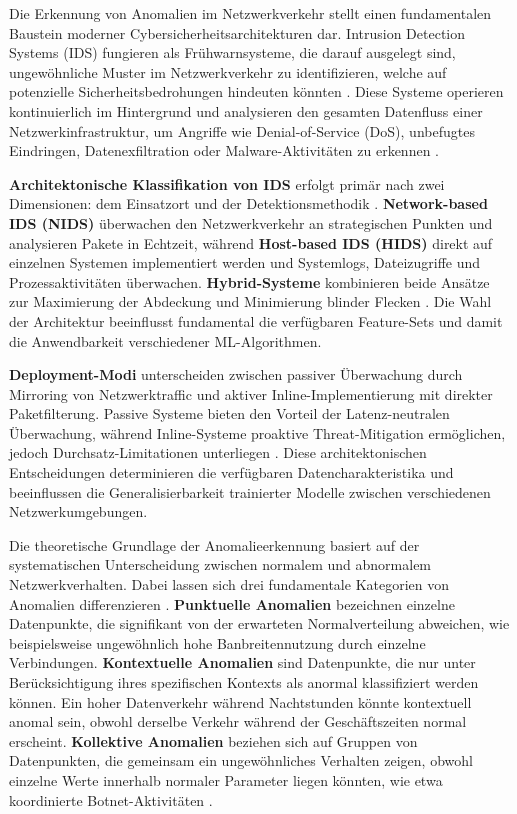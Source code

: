 \documentclass[11pt,a4paper]{article}
\begin{document}
    Die Erkennung von Anomalien im Netzwerkverkehr stellt einen fundamentalen Baustein moderner Cybersicherheitsarchitekturen dar. Intrusion Detection Systems (IDS) fungieren als Frühwarnsysteme, die darauf ausgelegt sind, ungewöhnliche Muster im Netzwerkverkehr zu identifizieren, welche  auf potenzielle Sicherheitsbedrohungen hindeuten könnten \parencite{Ring2019}. Diese Systeme operieren kontinuierlich im Hintergrund und analysieren den gesamten Datenfluss einer Netzwerkinfrastruktur, um Angriffe wie Denial-of-Service (DoS), unbefugtes Eindringen, Datenexfiltration oder Malware-Aktivitäten zu erkennen \parencite{Vinayakumar2019}.

    \textbf{Architektonische Klassifikation von IDS} erfolgt primär nach zwei Dimensionen: dem Einsatzort und der Detektionsmethodik \parencite{Ring2019}. \textbf{Network-based IDS (NIDS)} überwachen den Netzwerkverkehr an strategischen Punkten und analysieren Pakete in Echtzeit, während \textbf{Host-based IDS (HIDS)} direkt auf einzelnen Systemen implementiert werden und Systemlogs, Dateizugriffe und Prozessaktivitäten überwachen. \textbf{Hybrid-Systeme} kombinieren beide Ansätze zur Maximierung der Abdeckung und Minimierung blinder Flecken \parencite{Gharib2016}. Die Wahl der Architektur beeinflusst fundamental die verfügbaren Feature-Sets und damit die Anwendbarkeit verschiedener ML-Algorithmen.

    \textbf{Deployment-Modi} unterscheiden zwischen passiver Überwachung durch Mirroring von Netzwerktraffic und aktiver Inline-Implementierung mit direkter Paketfilterung. Passive Systeme bieten den Vorteil der Latenz-neutralen Überwachung, während Inline-Systeme proaktive Threat-Mitigation ermöglichen, jedoch Durchsatz-Limitationen unterliegen \parencite{Vinayakumar2019}. Diese architektonischen Entscheidungen determinieren die verfügbaren Datencharakteristika und beeinflussen die Generalisierbarkeit trainierter Modelle zwischen verschiedenen Netzwerkumgebungen.

    Die theoretische Grundlage der Anomalieerkennung basiert auf der systematischen Unterscheidung zwischen normalem und abnormalem Netzwerkverhalten. Dabei lassen sich drei fundamentale Kategorien von Anomalien differenzieren \parencite{Ring2019}. \textbf{Punktuelle Anomalien} bezeichnen einzelne Datenpunkte, die signifikant von der erwarteten Normalverteilung abweichen, wie beispielsweise ungewöhnlich hohe Banbreitennutzung durch einzelne Verbindungen. \textbf{Kontextuelle Anomalien} sind Datenpunkte, die nur unter Berücksichtigung ihres spezifischen Kontexts als anormal klassifiziert werden können. Ein hoher Datenverkehr während Nachtstunden könnte kontextuell anomal sein, obwohl derselbe Verkehr während der Geschäftszeiten normal erscheint. \textbf{Kollektive Anomalien} beziehen sich auf Gruppen von Datenpunkten, die gemeinsam ein ungewöhnliches Verhalten zeigen, obwohl einzelne Werte innerhalb normaler Parameter liegen könnten, wie etwa koordinierte Botnet-Aktivitäten \parencite{Ring2019}.
\end{document}
